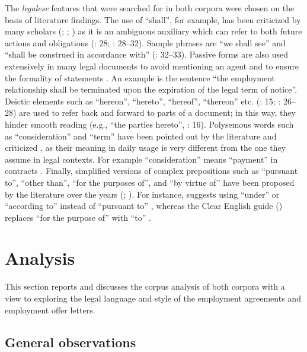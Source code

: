 \documentclass[output=paper]{langscibook}
\begin{document}
The \textit{legalese} features that were searched for in both corpora were chosen on the basis of literature findings. The use of “shall”, for example, has been criticized by many scholars (\citealt{Tiersma1999}; \citealt{Bhatia2010}; \citealt{Williams2023}) as it is an ambiguous auxiliary which can refer to both future actions and obligations (\citealt{Bhatia2010}: 28; \citealt{Williams2023}: 28–32). Sample phrases are “we shall see” and “shall be construed in accordance with” (\citealt{Williams2023}: 32–33). Passive forms are also used extensively in many legal documents to avoid mentioning an agent and to ensure the formality of statements \citep[32]{Williams2023}. An example is the sentence “the employment relationship shall be terminated upon the expiration of the legal term of notice”. \citep[32]{Williams2023} Deictic elements such as “hereon”, “hereto”, “hereof”, “thereon” etc. (\citealt{Abate1998}: 15; \citealt{Bhatia2010}: 26–28) are used to refer back and forward to parts of a document; in this way, they hinder smooth reading (e.g., “the parties hereto”, \citealt{Bhatia2010}: 16). Polysemous words such as “consideration” and “term” have been pointed out by the literature and criticized \citep{Scott2017}, as their meaning in daily usage is very different from the one they assume in legal contexts. For example “consideration” means “payment” in contracts \citep[45]{Scott2017}. Finally, simplified versions of complex prepositions such as “pursuant to”, “other than”, “for the purposes of”, and “by virtue of” have been proposed by the literature over the years (\citealt{Bhatia2010};  \citealt{ClearEnglish2014}). For instance, \citet{Bhatia2010} suggests using “under” or “according to” instead of “pursuant to” \citep[28]{Bhatia2010}, whereas the Clear English guide (\citeyear{ClearEnglish2014}) replaces “for the purpose of” with “to” \citep[2]{ClearEnglish2014}.

\section{Analysis}\label{sec:giampieri:4}

This section reports and discusses the corpus analysis of both corpora with a view to exploring the legal language and style of the employment agreements and employment offer letters.

\subsection{General observations}\label{sec:giampieri:4.1}
\end{document}
